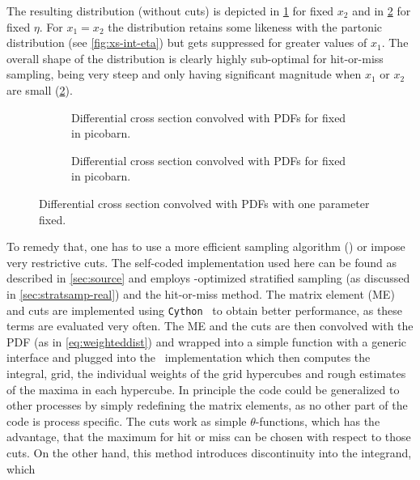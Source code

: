 The resulting distribution (without cuts) is depicted in
\cref{fig:dist-pdf} for fixed \(x_2\) and in
\cref{fig:dist-pdf-fixed-eta} for fixed \(\eta\). For \(x_1 = x_2\)
the distribution retains some likeness with the partonic distribution
(see \cref{fig:xs-int-eta}) but gets suppressed for greater values of
\(x_1\). The overall shape of the distribution is clearly highly
sub-optimal for hit-or-miss sampling, being very steep and only having
significant magnitude when \(x_1\) or \(x_2\) are small
(\cref{fig:dist-pdf-fixed-eta}).
%
\begin{figure}[ht]
  \centering
  \begin{subfigure}{1\textwidth}
    \centering {}
    \caption{\label{fig:dist-pdf}Differential cross section convolved
      with PDFs for fixed \protect {} in
      picobarn.}
  \end{subfigure}
%
  \begin{subfigure}{1\textwidth}
    \centering {}
    \caption{\label{fig:dist-pdf-fixed-eta}Differential cross section
      convolved with PDFs for fixed \protect
       in picobarn.}
  \end{subfigure}
  \caption{\label{fig:dist-pdf-3d}Differential cross section
    convolved with PDFs with one parameter fixed.}
\end{figure}
%
To remedy that, one has to use a more efficient sampling algorithm
(\vegas) or impose very restrictive cuts. The self-coded
implementation used here can be found as described in
\cref{sec:source} and employs \vegas-optimized stratified sampling (as
discussed in \cref{sec:stratsamp-real}) and the hit-or-miss
method. The matrix element (ME) and cuts are implemented using
\texttt{Cython}~\cite{behnel2011:cy} to obtain better performance, as
these terms are evaluated very often. The ME and the cuts are then
convolved with the PDF (as in \cref{eq:weighteddist}) and wrapped into
a simple function with a generic interface and plugged into the
\vegas\ implementation which then computes the integral, grid, the
individual weights of the grid hypercubes and rough estimates of the
maxima in each hypercube. In principle the code could be generalized
to other processes by simply redefining the matrix elements, as no
other part of the code is process specific. The cuts work as simple
\(\theta\)-functions, which has the advantage, that the maximum for
hit or miss can be chosen with respect to those cuts. On the other
hand, this method introduces discontinuity into the integrand, which
